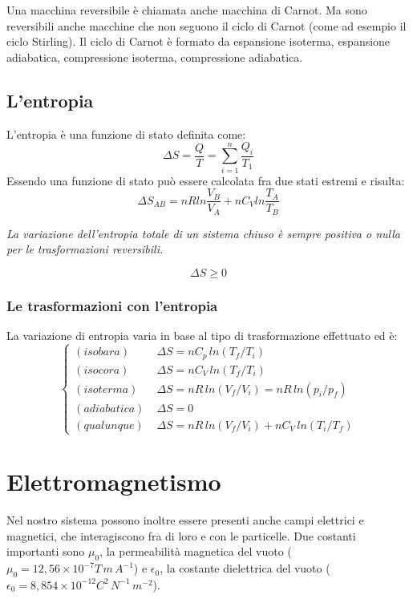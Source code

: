 \documentclass{article}
\begin{document}
Una macchina reversibile è chiamata anche macchina di Carnot. Ma sono reversibili anche macchine che non seguono il ciclo di Carnot (come ad esempio il ciclo Stirling). Il ciclo di Carnot è formato da espansione isoterma, espansione adiabatica, compressione isoterma, compressione adiabatica.

\subsection{L'entropia}
L'entropia è una funzione di stato definita come:
\begin{equation}
    \Delta S=\frac{Q}{T}=\sum_{i=1}^n\frac{Q_i}{T_1}
\end{equation}
Essendo una funzione di stato può essere calcolata fra due stati estremi e risulta:
\begin{equation}
    \Delta S_{AB}=nRln\frac{V_B}{V_A}+nC_Vln\frac{T_A}{T_B}
\end{equation}
\vspace{3mm}

\textit{La variazione dell'entropia totale di un sistema chiuso è sempre positiva o nulla per le trasformazioni reversibili.}
\vspace{3mm}

\begin{equation}
    \Delta S \geq 0
\end{equation}

\subsubsection{Le trasformazioni con l'entropia}
La variazione di entropia varia in base al tipo di trasformazione effettuato ed è:
\begin{equation}
    \begin{cases}
        (isobara) \; &\Delta S =nC_p\,ln(T_f/T_i)\\
        (isocora) \; &\Delta S =nC_V\,ln(T_f/T_i)\\
        (isoterma) \; &\Delta S =nR\,ln(V_f/V_i)=nR\,ln(p_i/p_f)\\
        (adiabatica) \; &\Delta S =0\\
        (qualunque) \; &\Delta S =nR\,ln(V_f/V_i)+nC_V\,ln(T_i/T_f)
    \end{cases}
\end{equation}




\section{Elettromagnetismo}
Nel nostro sistema possono inoltre essere presenti anche campi elettrici e magnetici, che interagiscono fra di loro e con le particelle.
Due costanti importanti sono $\mu_0$, la permeabilità magnetica del vuoto ($\mu_0=12,56 \times 10^{-7} T\,m\,A^{-1}$) e $\epsilon_0$, la costante dielettrica del vuoto ($\epsilon_0=8,854 \times 10^{-12} C^2\,N^{-1}\,m^{-2}$).
\end{document}

